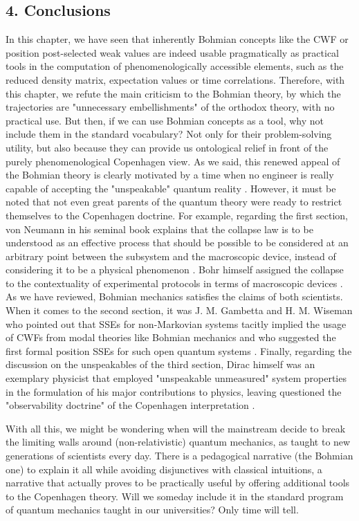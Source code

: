 \documentclass[11pt, a4paper]{article} %
\begin{document}
\subsection*{4. Conclusions}\vspace{-0.15cm}
In this chapter, we have seen that inherently Bohmian concepts like the CWF or position post-selected weak values are indeed usable pragmatically as practical tools in the computation of phenomenologically accessible elements, such as the reduced density matrix, expectation values or time correlations. Therefore, with this chapter, we refute the main criticism to the Bohmian theory, by which the trajectories are "unnecessary embellishments" of the orthodox theory, with no practical use. But then, if we can use Bohmian concepts as a tool, why not include them in the standard vocabulary? Not only for their problem-solving utility, but also because they can provide us ontological relief in front of the purely phenomenological Copenhagen view. As we said, this renewed appeal of the Bohmian theory is clearly motivated by a time when no engineer is really capable of accepting the "unspeakable" quantum reality \cite{where, consp}. However, it must be noted that not even great parents of the quantum theory were ready to restrict themselves to the Copenhagen doctrine. For example, regarding the first section, von Neumann in his seminal book \cite{vonNeumann} explains that the collapse law is to be understood as an effective process that should be possible to be considered at an arbitrary point between the subsystem and the macroscopic device, instead of considering it to be a physical phenomenon \cite{NeumannNoCollapse}. Bohr himself assigned the collapse to the contextuality of experimental protocols in terms of macroscopic devices \cite{Dirac}. As we have reviewed, Bohmian mechanics satisfies the claims of both scientists. When it comes to the second section, it was J. M. Gambetta and H. M. Wiseman who pointed out that SSEs for non-Markovian systems tacitly implied the usage of CWFs from modal theories like Bohmian mechanics \cite{interpretSSE, NMisModal} and who suggested the first formal position SSEs for such open quantum systems \cite{WisemanSSE}. Finally, regarding the discussion on the unspeakables of the third section, Dirac himself was an exemplary physicist that employed "unspeakable unmeasured" system properties in the formulation of his major contributions to physics, leaving questioned the "observability doctrine" of the Copenhagen interpretation \cite{Dirac}.

With all this, we might be wondering when will the mainstream decide to break the limiting walls around (non-relativistic) quantum mechanics, as taught to new generations of scientists every day. There is a pedagogical narrative (the Bohmian one) to explain it all while avoiding disjunctives with classical intuitions, a narrative that actually proves to be practically useful by offering additional tools to the Copenhagen theory. Will we someday include it in the standard program of quantum mechanics taught in our universities? Only time will tell.
\vspace{-0.2cm}

{
\printbibliography
}
\end{document}
